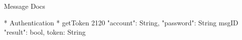Message Docs

* Authentication *
getToken {
    2120 {
        "account": String,
        "password": String
    }
    msgID {
        "result": bool,
        token: String
    }
}
